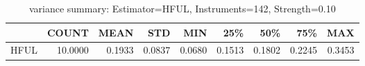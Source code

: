 \begin{table}[ht]
\centering
\caption{variance summary: Estimator=HFUL, Instruments=142, Strength=0.10}
\begin{tabular}{lrrrrrrrr}
\toprule
 & COUNT & MEAN & STD & MIN & 25\% & 50\% & 75\% & MAX \\
\midrule
HFUL & 10.0000 & 0.1933 & 0.0837 & 0.0680 & 0.1513 & 0.1802 & 0.2245 & 0.3453 \\
\bottomrule
\end{tabular}
\end{table}
